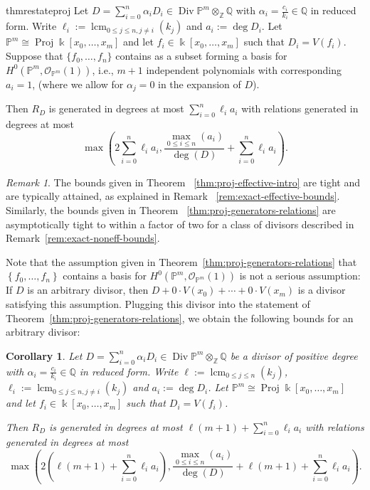 \documentclass{amsart}
\theoremstyle{plain}
\newtheorem{cor}[thm]{Corollary}
\theoremstyle{definition}
\theoremstyle{remark}
\newtheorem{rem}[thm]{Remark}
\numberwithin{equation}{section}
\newcommand\bq{{\mathbb Q}}
\newcommand\bp{{\mathbb P}}
\newcommand\bz{{\mathbb Z}}
\newcommand\bk{{\Bbbk}}
\newcommand\sco{{\mathscr O}}
\DeclareMathOperator\di{Div}
\newcommand\bida{a}
\DeclareMathOperator{\proj}{Proj}
\DeclareMathOperator{\lcm}{lcm}
\begin{document}
\begin{restatable}{thm}{restateproj}
\label{thm:proj-generators-relations}
Let $D = \sum_{i = 0}^n \alpha_i D_i \in \di \bp^m \otimes_\bz \bq$
with $\alpha_i = \frac{c_i}{k_i}\in \bq$ in reduced form. Write
$\ell_i := \lcm_{0\le j \le n, j \ne i}(k_j)$ and $a_i := \deg D_i$. Let $\bp^m
\cong \proj \bk[x_0, \ldots, x_m]$ and let
$f_i \in \bk[x_0, \ldots, x_m]$ such that $D_i = V(f_i)$. 
Suppose that $\{f_0, \ldots, f_n\}$ contains as a subset forming a basis
for $H^0(\bp^m, \sco_{\bp^m}(1))$, i.e., $m+1$ independent polynomials with corresponding $a_i = 1$,
{\rm(}where we allow for 
$\alpha_j = 0$ in the expansion of $D${\rm)}.

Then $R_D$ is generated in degrees at most 
$\sum_{i = 0}^n \ell_i a_i$
with relations generated in degrees at most
\[
	\max \left(2 \sum_{i=0}^n \ell_i a_i, \frac{\max_{0 \le i \le n}
	(	\bida_i)}{\deg(D)} + \sum_{i=0}^n \ell_i a_i \right).
\]
\end{restatable}

\begin{rem}
\label{rem:proj-tight-bounds}
The bounds
given in Theorem ~\ref{thm:proj-effective-intro}
are tight and are typically attained, as explained in
Remark ~\ref{rem:exact-effective-bounds}.
Similarly, the bounds given in Theorem 
~\ref{thm:proj-generators-relations} are asymptotically
tight to within a factor of two 
for a class of divisors described in
Remark~\ref{rem:exact-noneff-bounds}.
\end{rem}

Note that the assumption given in Theorem~\ref{thm:proj-generators-relations}
that $\left\{ f_0, \ldots, f_n \right\}$ contains a basis for $H^0(\bp^m, \sco_{\bp^m}(1))$ is not a serious assumption:
If $D$ is an arbitrary divisor, then $D + 0 \cdot V(x_0) + \cdots + 0 \cdot V(x_m)$ is a divisor satisfying this assumption. Plugging this divisor into the statement
of Theorem~\ref{thm:proj-generators-relations}, we obtain the following bounds for an arbitrary divisor:
\begin{cor}
	\label{cor:proj-generators-relations}
	Let $D = \sum_{i = 0}^n \alpha_i D_i \in \di \bp^m \otimes_\bz \bq$ be a divisor of positive degree
with $\alpha_i = \frac{c_i}{k_i}\in \bq$ in reduced form. Write
$\ell := \lcm_{0 \leq j \leq n}(k_j)$, $\ell_i := \lcm_{0\le j \le n, j \ne i}(k_j)$ and $a_i := \deg D_i$. Let $\bp^m
\cong \proj \bk[x_0, \ldots, x_m]$ and let
$f_i \in \bk[x_0, \ldots, x_m]$ such that $D_i = V(f_i)$. 

Then $R_D$ is generated in degrees at most 
$\ell(m+1) + \sum_{i = 0}^n \ell_i a_i$
with relations generated in degrees at most
\[
	\max \left(2 \left(\ell(m+1)+\sum_{i=0}^n \ell_i a_i \right), \frac{\max_{0 \le i \le n}
	(	\bida_i)}{\deg(D)} + \ell(m+1) + \sum_{i=0}^n \ell_i a_i \right).
\]
\end{cor}
\end{document}
